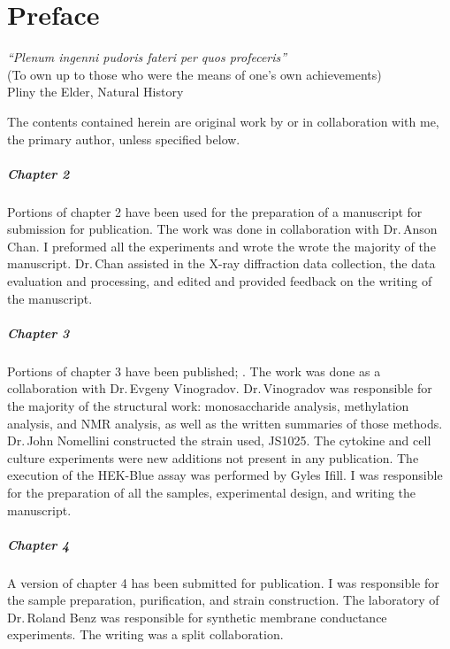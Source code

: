 
\chapter{Preface}
\begin{epigraph} 
\textit{``Plenum ingenni pudoris fateri per quos profeceris''}\\
(To own up to those who were the means of one's own achievements)\\
Pliny the Elder, Natural History
\end{epigraph} 

The contents contained herein are original work by or in collaboration with me,
the primary author, unless specified below.

\paragraph{Chapter 2} 
Portions of chapter 2 have been used for the preparation of a manuscript for
submission for publication. The work was done in collaboration with Dr.\,Anson
Chan. I preformed all the experiments and wrote the wrote the majority of the
manuscript. Dr.\,Chan assisted in the X-ray diffraction data collection, the
data evaluation and processing, and edited and provided feedback on the writing
of the manuscript. 

\paragraph{Chapter 3}
Portions of chapter 3 have been published; . The work was
done as a collaboration with Dr.\,Evgeny Vinogradov. Dr.\,Vinogradov was
responsible for the majority of the structural work: monosaccharide analysis,
methylation analysis, and \textsc{NMR} analysis, as well as the written
summaries of those methods. Dr.\,John Nomellini constructed the strain used,
JS1025. The cytokine and cell culture experiments were new additions not present
in any publication. The execution of the HEK-Blue assay was performed by Gyles Ifill. I was
responsible for the preparation of all the samples, experimental design, and
writing the manuscript. 

\paragraph{Chapter 4}
A version of chapter 4 has been submitted for publication. I was responsible for
the sample preparation, purification, and strain construction. The laboratory of
Dr.\,Roland Benz was responsible for synthetic membrane conductance experiments.
The writing was a split collaboration.